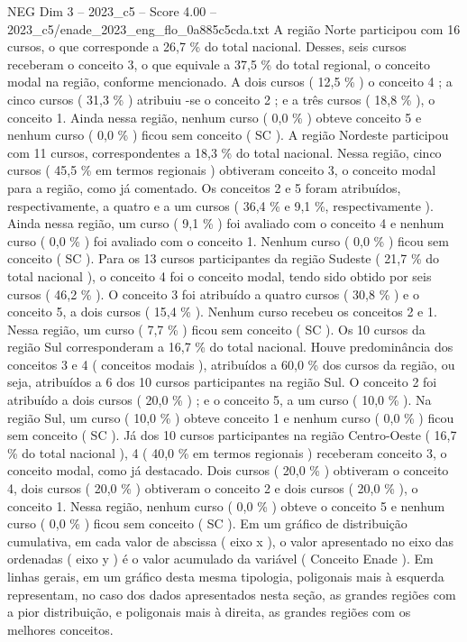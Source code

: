 \begin{textsample}{NEG Dim 3 – 2023\_c5 – Score 4.00 – 2023\_c5/enade\_2023\_eng\_flo\_0a885c5cda.txt}
A região Norte participou com 16 cursos, o que corresponde a 26,7 \% do total nacional.
Desses, seis cursos receberam o conceito 3, o que equivale a 37,5 \% do total regional, o conceito modal na região, conforme mencionado.
A dois cursos ( 12,5 \% ) o conceito 4 ; a cinco cursos ( 31,3 \% ) atribuiu -se o conceito 2 ; e a três cursos ( 18,8 \% ), o conceito 1.
Ainda nessa região, nenhum curso ( 0,0 \% ) obteve conceito 5 e nenhum curso ( 0,0 \% ) ficou sem conceito ( SC ).
A região Nordeste participou com 11 cursos, correspondentes a 18,3 \% do total nacional.
Nessa região, cinco cursos ( 45,5 \% em termos regionais ) obtiveram conceito 3, o conceito modal para a região, como já comentado.
Os conceitos 2 e 5 foram atribuídos, respectivamente, a quatro e a um cursos ( 36,4 \% e 9,1 \%, respectivamente ).
Ainda nessa região, um curso ( 9,1 \% ) foi avaliado com o conceito 4 e nenhum curso ( 0,0 \% ) foi avaliado com o conceito 1.
Nenhum curso ( 0,0 \% ) ficou sem conceito ( SC ).
Para os 13 cursos participantes da região Sudeste ( 21,7 \% do total nacional ), o conceito 4 foi o conceito modal, tendo sido obtido por seis cursos ( 46,2 \% ).
O conceito 3 foi atribuído a quatro cursos ( 30,8 \% ) e o conceito 5, a dois cursos ( 15,4 \% ).
Nenhum curso recebeu os conceitos 2 e 1.
Nessa região, um curso ( 7,7 \% ) ficou sem conceito ( SC ).
Os 10 cursos da região Sul corresponderam a 16,7 \% do total nacional.
Houve predominância dos conceitos 3 e 4 ( conceitos modais ), atribuídos a 60,0 \% dos cursos da região, ou seja, atribuídos a 6 dos 10 cursos participantes na região Sul.
O conceito 2 foi atribuído a dois cursos ( 20,0 \% ) ; e o conceito 5, a um curso ( 10,0 \% ).
Na região Sul, um curso ( 10,0 \% ) obteve conceito 1 e nenhum curso ( 0,0 \% ) ficou sem conceito ( SC ).
Já dos 10 cursos participantes na região Centro-Oeste ( 16,7 \% do total nacional ), 4 ( 40,0 \% em termos regionais ) receberam conceito 3, o conceito modal, como já destacado.
Dois cursos ( 20,0 \% ) obtiveram o conceito 4, dois cursos ( 20,0 \% ) obtiveram o conceito 2 e dois cursos ( 20,0 \% ), o conceito 1.
Nessa região, nenhum curso ( 0,0 \% ) obteve o conceito 5 e nenhum curso ( 0,0 \% ) ficou sem conceito ( SC ).
Em um gráfico de distribuição cumulativa, em cada valor de abscissa ( eixo x ), o valor apresentado no eixo das ordenadas ( eixo y ) é o valor acumulado da variável ( Conceito Enade ).
Em linhas gerais, em um gráfico desta mesma tipologia, poligonais mais à esquerda representam, no caso dos dados apresentados nesta seção, as grandes regiões com a pior distribuição, e poligonais mais à direita, as grandes regiões com os melhores conceitos.

\end{textsample}
